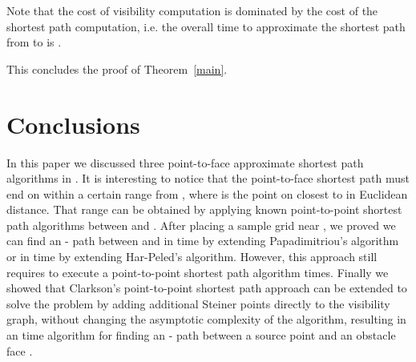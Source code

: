 \documentclass{llncs}
\begin{document}
Note that the cost of visibility computation is dominated by the cost of the shortest path computation, i.e. the overall time to approximate the shortest path from  to  is .

This concludes the proof of Theorem~\ref{main}.

\section{Conclusions}
In this paper we discussed three point-to-face approximate shortest path algorithms
in .
It is interesting to notice that the point-to-face shortest
path must end on  within a certain range from , where  is the point on  closest to  in
Euclidean distance. That range can be obtained by applying known point-to-point shortest path algorithms
between  and . After placing a sample grid near , we proved we
can find an - path
between  and  in  time
by extending Papadimitriou's algorithm or in
 time by
extending Har-Peled's algorithm. However, this approach still requires to execute a point-to-point
shortest path algorithm  times.
Finally we showed that Clarkson's point-to-point shortest path approach can be extended to solve the
problem by adding additional Steiner points directly to the visibility graph, without changing the
asymptotic complexity of the algorithm, resulting in an
 time algorithm for finding
an - path between a source point  and an obstacle face .
\end{document}
